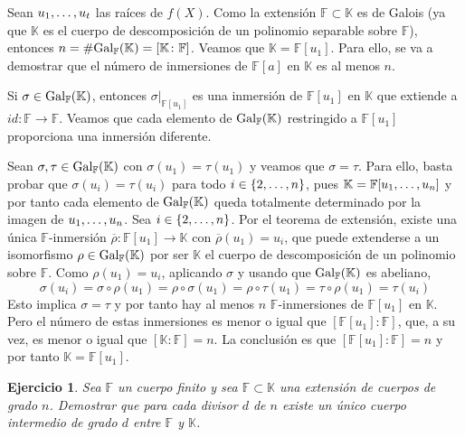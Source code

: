 \documentclass[11pt]{report}
\makeatletter
\renewenvironment{proof}[1][\proofname]{\par
  \pushQED{\qed}%
  \normalfont \topsep\z@skip %
  \trivlist
  \item[\hskip\labelsep
        \itshape
    #1\@addpunct{.}]\ignorespaces
}{%
  \popQED\endtrivlist\@endpefalse
}
\newcommand{\F}{\mathbb F}
\newcommand{\K}{\mathbb K}
\newtheorem{ejercicio}{Ejercicio}
\makeatother
\begin{document}
\begin{proof}
Sean $u_1,\mathellipsis,u_t$ las raíces de $f(X)$. Como la extensión $\F \subset \K$ es de Galois (ya que $\K$ es el cuerpo de descomposición de un polinomio separable sobre $\F$), entonces $n = \#\textup{Gal}_\F(\K) = [\K \colon \F]$. Veamos que $\K = \F[u_1]$. Para ello, se va a demostrar que el número de inmersiones de $\F[a]$ en $\K$ es al menos $n$. 

Si $\sigma \in \textup{Gal}_\F(\K)$, entonces $\sigma \big |_{\F[u_1]}$ es una inmersión de $\F[u_1]$ en $\K$ que extiende a $id \colon \F \to \F$. Veamos que cada elemento de $\textup{Gal}_\F(\K)$ restringido a $\F[u_1]$ proporciona una inmersión diferente.

Sean $\sigma,\tau \in \textup{Gal}_\F(\K)$ con $\sigma(u_1) = \tau(u_1)$ y veamos que $\sigma = \tau$. Para ello, basta probar que $\sigma(u_i)=\tau(u_i)$ para todo $i \in \{2,\mathellipsis,n\}$, pues $\K = \F[u_1,\mathellipsis,u_n]$ y por tanto cada elemento de $\textup{Gal}_\F(\K)$ queda totalmente determinado por la imagen de $u_1,\mathellipsis,u_n$. Sea $i \in \{2,\mathellipsis,n\}$. Por el teorema de extensión, existe una única $\F$-inmersión $\overline{\rho} \colon \F[u_1] \to \K$ con $\overline{\rho}(u_1)=u_i$, que puede extenderse a un isomorfismo $\rho \in \textup{Gal}_{\F}(\K)$ por ser $\K$ el cuerpo de descomposición de un polinomio sobre $\F$. Como $\rho(u_1) = u_i$, aplicando $\sigma$ y usando que $\textup{Gal}_\F(\K)$ es abeliano,
\[\sigma(u_i)=\sigma \circ \rho(u_1)= \rho \circ \sigma(u_1) = \rho \circ \tau(u_1) = \tau \circ \rho(u_1) = \tau(u_i)\]
Esto implica $\sigma = \tau$ y por tanto hay al menos $n$ $\F$-inmersiones de $\F[u_1]$ en $\K$. Pero el número de estas inmersiones es menor o igual que $[\F[u_1] \colon \F]$, que, a su vez, es menor o igual que $[\K \colon \F] = n$. La conclusión es que $[\F[u_1] \colon \F] = n$ y por tanto $\K = \F[u_1]$.
\end{proof}

\begin{ejercicio}
Sea $\F$ un cuerpo finito y sea $\F \subset \K$ una extensión de cuerpos de grado $n$. Demostrar que para cada divisor $d$ de $n$ existe un único cuerpo intermedio de grado $d$ entre $\F$ y $\K$.
\end{ejercicio}
\end{document}
